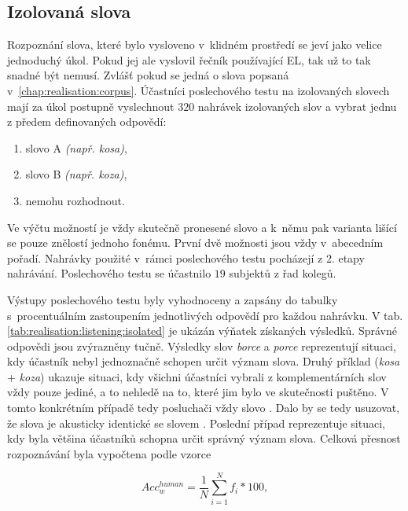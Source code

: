 \subsection{Izolovaná slova}
\label{chap:realisation:listening:isolated}

Rozpoznání slova, které bylo vysloveno v~klidném prostředí se jeví jako velice jednoduchý úkol.
Pokud jej ale vyslovil řečník používající EL, tak už to tak snadné být nemusí.
Zvlášť pokud se jedná o slova popsaná v~\ref{chap:realisation:corpus}.
Účastníci poslechového testu na izolovaných slovech mají za úkol postupně vyslechnout $320$ nahrávek izolovaných slov a vybrat jednu z předem definovaných odpovědí:

\begin{enumerate}[label=\alph*)]
  \item slovo A \textit{(např. kosa)},
  \item slovo B \textit{(např. koza)},
  \item nemohu rozhodnout.
\end{enumerate}

\noindent Ve výčtu možností je vždy skutečně pronesené slovo a  k~němu pak varianta lišící se pouze znělostí jednoho fonému. První dvě možnosti jsou vždy v~abecedním pořadí. Nahrávky použité v~rámci poslechového testu pocházejí z 2. etapy nahrávání. Poslechového testu se účastnilo $19$ subjektů z řad kolegů.

Výstupy poslechového testu byly vyhodnoceny a zapsány do tabulky s~procentuálním zastoupením jednotlivých odpovědí pro každou nahrávku.
V tab. \ref{tab:realisation:listening:isolated} je ukázán výňatek získaných výsledků. Správné odpovědi jsou zvýrazněny tučně.
Výsledky slov \textit{borce} a \textit{porce} reprezentují situaci, kdy účastník nebyl jednoznačně schopen určit význam slova.
Druhý příklad (\textit{kosa} + \textit{koza}) ukazuje situaci, kdy všichni účastníci vybrali z komplementárních slov vždy pouze jediné, a to nehledě na to, které jim bylo ve skutečnosti puštěno.
V tomto konkrétním případě tedy posluchači vždy  slovo .
Dalo by se tedy usuzovat, že slova  je akusticky identické se slovem .
Poslední případ reprezentuje situaci, kdy byla většina účastníků schopna určit správný význam slova.
Celková přesnost rozpoznávání byla vypočtena podle vzorce

\begin{equation}
  Acc_w^{human} = \frac{1}{N} \sum_{i=1}^{N} f_i * 100,
  \label{eq:realisation:accuracy:human}
\end{equation}

